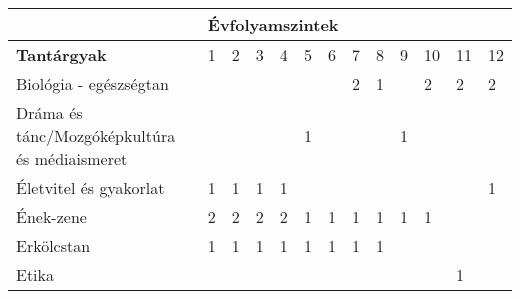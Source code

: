 \begin{landscape}
\begin{table}[]
  \begin{tabular}{l|l|l|l|l|l|l|l|l|l|l|l|l}
  
                                                        & \multicolumn{12}{l}{\textbf{Évfolyamszintek}}                                                                                                                                                           \\ \hline
    \textbf{Tantárgyak}                                          & 1                                     & 2           & 3           & 4           & 5           & 6           & 7           & 8           & 9           & 10          & 11          & 12          \\ \hline
    Biológia - egészségtan                              &                                       &             &             &             &             &             & 2           & 1           &             & 2           & 2           & 2           \\ \hline
    Dráma és tánc/Mozgóképkultúra és médiaismeret      &                                       &             &             &             & 1           &             &             &             & 1           &             &             &             \\ \hline
    Életvitel és gyakorlat                              & 1                                     & 1           & 1           & 1           &             &             &             &             &             &             &             & 1           \\ \hline
    Ének-zene                                           & 2                                     & 2           & 2           & 2           & 1           & 1           & 1           & 1           & 1           & 1           &             &             \\ \hline
    Erkölcstan                                          & 1                                     & 1           & 1           & 1           & 1           & 1           & 1           & 1           &             &             &             &             \\ \hline
    Etika                                               &                                       &             &             &             &             &             &             &             &             &             & 1           &             \\ \hline

\end{tabular}
\end{table}
\end{landscape}
